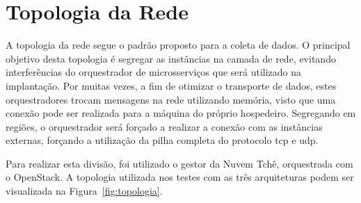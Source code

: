 \section{Topologia da Rede}
\label{sec:topologia}

A topologia da rede segue o padrão proposto para a coleta de dados.
%
O principal objetivo desta topologia é segregar as instâncias na camada de rede, evitando interferências do orquestrador de microsserviços que será utilizado na implantação. %
%
Por muitas vezes, a fim de otimizar o transporte de dados, estes orquestradores trocam mensagens na rede utilizando memória, visto que uma conexão pode ser realizada para a máquina do próprio hospedeiro.
%
Segregando em regiões, o orquestrador será forçado a realizar a conexão com as instâncias externas, forçando a utilização da pilha completa do protocolo \ac{tcp} e \ac{udp}.%

Para realizar esta divisão, foi utilizado o gestor da Nuvem Tchê, orquestrada com o OpenStack.
%
A topologia utilizada nos testes com as três arquiteturas podem ser visualizada na Figura~\ref{fig:topologia}.

% 
% 


